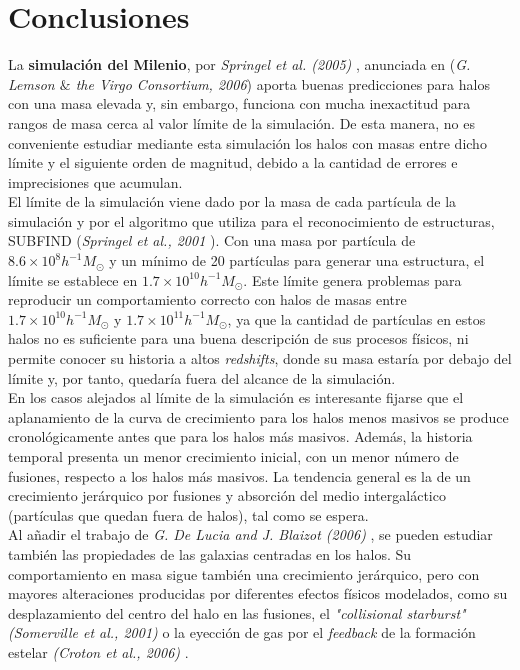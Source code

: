 \section{Conclusiones} 
\label{sec:4}

La \textbf{simulación del Milenio}\cite{6}, por \textit{Springel et al. (2005)} \cite{1}, anunciada en (\textit{G. Lemson $\&$ the Virgo Consortium, 2006}\cite{5}) aporta buenas predicciones para halos con una masa elevada y, sin embargo, funciona con mucha inexactitud para rangos de masa cerca al valor límite de la simulación. De esta manera, no es conveniente estudiar mediante esta simulación los halos con masas entre dicho límite y el siguiente orden de magnitud, debido a la cantidad de errores e imprecisiones que acumulan. \\

El límite de la simulación viene dado por la masa de cada partícula de la simulación y por el algoritmo que utiliza para el reconocimiento de estructuras, SUBFIND (\textit{Springel et al., 2001} \cite{8}). Con una masa por partícula de $8.6\times 10^{8}h^{-1}M_\odot$ y un mínimo de 20 partículas para generar una estructura, el límite se establece en $1.7\times 10^{10}h^{-1}M_\odot$. Este límite genera problemas para reproducir un comportamiento correcto con halos de masas entre  $1.7\times 10^{10}h^{-1}M_{\odot}$ y $1.7\times 10^{11}h^{-1}M_\odot$, ya que la cantidad de partículas en estos halos no es suficiente para una buena descripción de sus procesos físicos, ni permite conocer su historia a altos \textit{redshifts}, donde su masa estaría por debajo del límite y, por tanto, quedaría fuera del alcance de la simulación. \\

En los casos alejados al límite de la simulación es interesante fijarse que el aplanamiento de la curva de crecimiento para los halos menos masivos se produce cronológicamente antes que para los halos más masivos. Además, la historia temporal presenta un menor crecimiento inicial, con un menor número de fusiones, respecto a los halos más masivos. La tendencia general es la de un crecimiento jerárquico por fusiones y absorción del medio intergaláctico (partículas que quedan fuera de halos), tal como se espera. \\

Al añadir el trabajo de \textit{G. De Lucia and J. Blaizot (2006)} \cite{2}, se pueden estudiar también las propiedades de las galaxias centradas en los halos. Su comportamiento en masa sigue también una crecimiento jerárquico, pero con mayores alteraciones producidas por diferentes efectos físicos modelados, como su desplazamiento del centro del halo en las fusiones, el \textit{"collisional starburst" (Somerville et al., 2001)} \cite{3} o la eyección de gas por el \textit{feedback} de la formación estelar \textit{(Croton et al., 2006)} \cite{10}. \\

